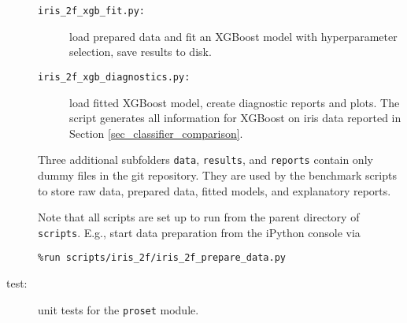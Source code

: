 \begin{description}
\begin{description}
%
\item[\texttt{iris\_2f\_xgb\_fit.py:}] load prepared data and fit an XGBoost model with hyperparameter selection, save results to disk.
%
\item[\texttt{iris\_2f\_xgb\_diagnostics.py:}] load fitted XGBoost model, create diagnostic reports and plots.
The script generates all information for XGBoost on iris data reported in Section \ref{sec_classifier_comparison}.
\end{description}
%
Three additional subfolders \texttt{data}, \texttt{results}, and \texttt{reports} contain only dummy files in the git repository.
They are used by the benchmark scripts to store raw data, prepared data, fitted models, and explanatory reports.\par
%
Note that all scripts are set up to run from the parent directory of \texttt{scripts}.
E.g., start data preparation from the iPython console via
%
\begin{center}
\texttt{\%run scripts/iris\_2f/iris\_2f\_prepare\_data.py}
\end{center}
%
\item[test:] unit tests for the \texttt{proset} module.
\end{description}
%
